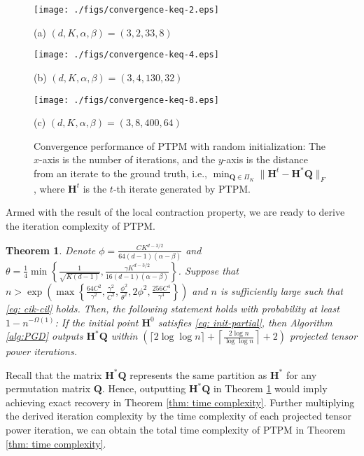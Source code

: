 \documentclass{article}
\theoremstyle{plain}
\newtheorem{theorem}{Theorem}[section] %
\theoremstyle{definition}
\theoremstyle{remark}
\newcommand{\BH}{\bm{H}}
\newcommand{\BQ}{\bm{Q}}
\begin{document}
\begin{figure*}[t]
	\begin{center}
		\begin{minipage}[b]{0.31\linewidth}
			\centering
			\centerline{\texttt{[image: ./figs/convergence-keq-2.eps]}}
			\centerline{(a) {\footnotesize $(d,K,\alpha,\beta)=(3,2,33,8)$}}\medskip
		\end{minipage}
		\begin{minipage}[b]{0.31\linewidth}
			\centering
			\centerline{\texttt{[image: ./figs/convergence-keq-4.eps]}}
			\centerline{(b) {\footnotesize $(d,K,\alpha,\beta)=(3,4,130,32)$}} \medskip
		\end{minipage}
		\begin{minipage}[b]{0.3\linewidth}
			\centering
			\centerline{\texttt{[image: ./figs/convergence-keq-8.eps]}}
			\centerline{(c) {\footnotesize $(d,K,\alpha,\beta)=(3,8,400,64)$}} \medskip
		\end{minipage}
	\end{center}
	\vskip -0.2in
	\caption{Convergence performance of PTPM with random initialization: The $x$-axis is the number of iterations, and the $y$-axis is the distance from an iterate to the ground truth, i.e., $\min_{\BQ \in \Pi_K}\|\BH^t-\BH^*\BQ\|_F$, where $\BH^t$ is the $t$-th iterate generated by PTPM.}
	\label{fig: convergence}
\end{figure*}
Armed with the result of the local contraction property, we are ready to derive the iteration complexity of PTPM.
\begin{theorem}\label{thm: iteration complexity}
	Denote $\phi = \frac{C K^{d-3/2}}{64(d-1)(\alpha - \beta)}$ and $\theta = \frac{1}{4}\min \left\{\frac{1}{\sqrt{K(d-1)}}, \frac{\gamma K^{d-3/2}}{16(d-1)(\alpha - \beta)} \right\}$. Suppose that $n > \exp \left(\max \left\{ \frac{64C^2}{\gamma^2}, \frac{\gamma^2}{C^2}, \frac{\phi^2}{\theta^2}, 2\phi^2,\frac{256C^4}{\gamma^4} \right\}\right)$ and $n$ is sufficiently large such that \eqref{eq: cik-cil} holds. Then, the following statement holds with probability at least $1 - n^{-\Omega(1)}$: If the initial point $\BH^0$ satisfies \eqref{eq: init-partial}, then Algorithm \ref{alg:PGD} outputs $\BH^* \BQ$ within $\left(\lceil 2\log\log n \rceil+\left\lceil \frac{2\log n}{\log\log n} \right\rceil+2\right)$ projected tensor power iterations.
\end{theorem}
Recall that the matrix $\bm{H}^*\bm{Q}$ represents the same partition as $\bm{H}^*$ for any permutation matrix $\bm{Q}$. Hence, outputting $\bm{H}^*\bm{Q}$ in Theorem \ref{thm: iteration complexity} would imply achieving exact recovery in Theorem \ref{thm: time complexity}. Further multiplying the derived iteration complexity by the time complexity of each projected tensor power iteration, we can obtain the total time complexity of PTPM in Theorem \ref{thm: time complexity}.
\end{document}
